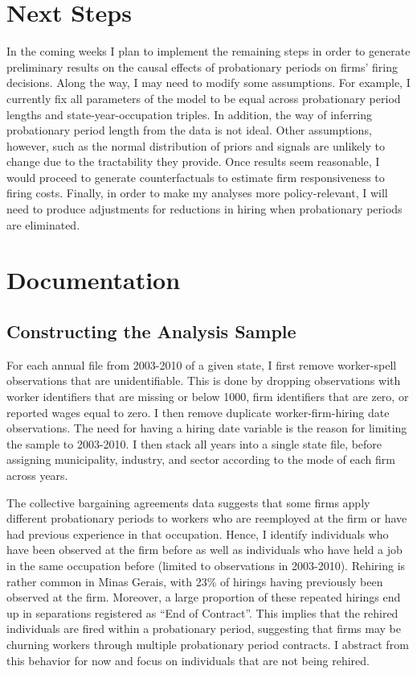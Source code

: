 \documentclass[12pt]{article}
\begin{document}
\section{Next Steps}

In the coming weeks I plan to implement the remaining steps in order to generate preliminary results on the causal effects of probationary periods on firms' firing decisions.
Along the way, I may need to modify some assumptions.
For example, I currently fix all parameters of the model to be equal across probationary period lengths and state-year-occupation triples.
In addition, the way of inferring probationary period length from the data is not ideal.
Other assumptions, however, such as the normal distribution of priors and signals are unlikely to change due to the tractability they provide.
Once results seem reasonable, I would proceed to generate counterfactuals to estimate firm responsiveness to firing costs.
Finally, in order to make my analyses more policy-relevant, I will need to produce adjustments for reductions in hiring when probationary periods are eliminated.

\newpage

\appendix

\section{Documentation}

\subsection{Constructing the Analysis Sample} \label{analysis_sample}

For each annual file from 2003-2010 of a given state, I  first remove worker-spell observations that are unidentifiable.
This is done by dropping observations with worker identifiers that are missing or below 1000, firm identifiers that are zero, or reported wages equal to zero.
I then remove duplicate worker-firm-hiring date observations.
The need for having a hiring date variable is the reason for limiting the sample to 2003-2010.
I then stack all years into a single state file, before assigning municipality, industry, and sector according to the mode of each firm across years.

The collective bargaining agreements data suggests that some firms apply different probationary periods to workers who are reemployed at the firm or have had previous experience in that occupation. 
Hence, I identify individuals who have been observed at the firm before as well as individuals who have held a job in the same occupation before (limited to observations in 2003-2010).  
Rehiring is rather common in Minas Gerais, with 23\% of hirings having previously been observed at the firm.
Moreover, a large proportion of these repeated hirings end up in separations registered as ``End of Contract''.
This implies that the rehired individuals are fired within a probationary period, suggesting that firms may be churning workers through multiple probationary period contracts.
I abstract from this behavior for now and focus on individuals that are not being rehired.
\end{document}

